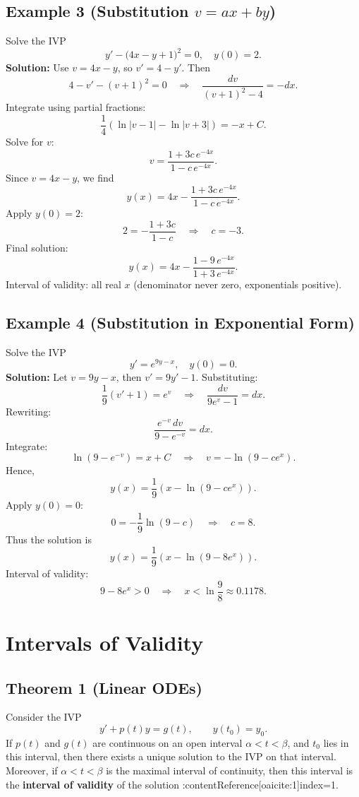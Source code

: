 \documentclass[12pt]{book}
\begin{document}
\subsection*{Example 3 (Substitution \(v = ax + by\))}
Solve the IVP
\[
y' - \bigl(4x - y + 1\bigr)^2 = 0,\quad y(0) = 2.
\]
\textbf{Solution:}
Use \(v = 4x - y\), so \(v' = 4 - y'\). Then
\[
4 - v' - (v + 1)^2 = 0
\quad\Longrightarrow\quad
\frac{dv}{(v + 1)^2 - 4} = -dx.
\]
Integrate using partial fractions:
\[
\frac{1}{4}\left(\ln|v-1| - \ln|v+3|\right) = -x + C.
\]
Solve for \(v\):
\[
v = \frac{1 + 3c\,e^{-4x}}{1 - c\,e^{-4x}}.
\]
Since \(v = 4x - y\), we find
\[
y(x) = 4x - \frac{1 + 3c\,e^{-4x}}{1 - c\,e^{-4x}}.
\]
Apply \(y(0)=2\):
\[
2 = -\frac{1 + 3c}{1 - c}
\quad\Longrightarrow\quad
c = -3.
\]
Final solution:
\[
y(x) = 4x - \frac{1 - 9\,e^{-4x}}{1 + 3\,e^{-4x}}.
\]
Interval of validity: all real \(x\) (denominator never zero, exponentials positive).

\subsection*{Example 4 (Substitution in Exponential Form)}
Solve the IVP
\[
y' = e^{9y - x},\quad y(0) = 0.
\]
\textbf{Solution:}
Let \(v = 9y - x\), then \(v' = 9y' - 1\). Substituting:
\[
\frac{1}{9}(v' + 1) = e^v 
\quad\Longrightarrow\quad
\frac{dv}{9e^v - 1} = dx.
\]
Rewriting:
\[
\frac{e^{-v}\,dv}{9 - e^{-v}} = dx.
\]
Integrate:
\[
\ln\left(9 - e^{-v}\right) = x + C
\quad\Longrightarrow\quad
v = -\ln\left(9 - c e^x\right).
\]
Hence,
\[
y(x) = \frac{1}{9}\left(x - \ln\left(9 - c e^x\right)\right).
\]
Apply \(y(0)=0\):
\[
0 = -\frac{1}{9}\ln(9 - c)
\quad\Longrightarrow\quad
c = 8.
\]
Thus the solution is
\[
y(x) = \frac{1}{9}\left(x - \ln\left(9 - 8e^x\right)\right).
\]
Interval of validity:
\[
9 - 8e^x > 0 \quad\Longrightarrow\quad x < \ln\frac{9}{8} \approx 0.1178.
\]

\section{Intervals of Validity}

\subsection*{Theorem 1 (Linear ODEs)}
Consider the IVP
\[
y' + p(t)y = g(t), \qquad y(t_0) = y_0.
\]
If \(p(t)\) and \(g(t)\) are continuous on an open interval \(\alpha < t < \beta\), and \(t_0\) lies in this interval, then there exists a unique solution to the IVP on that interval.\\
Moreover, if \(\alpha < t < \beta\) is the maximal interval of continuity, then this interval is the \textbf{interval of validity} of the solution :contentReference[oaicite:1]{index=1}.
\end{document}
